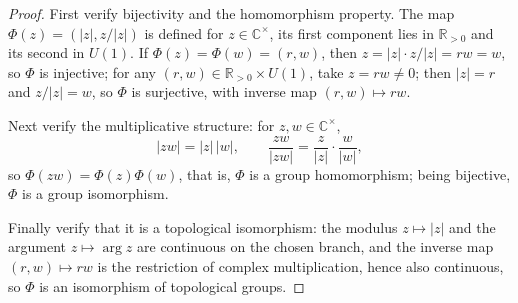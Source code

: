 \begin{proof}
First verify bijectivity and the homomorphism property. The map $\Phi(z)=(|z|,z/|z|)$ is defined for $z\in\mathbb{C}^{\times}$, its first component lies in $\mathbb{R}_{>0}$ and its second in $U(1)$. If $\Phi(z)=\Phi(w)=(r,w)$, then $z=|z|\cdot z/|z|=rw=w$, so $\Phi$ is injective; for any $(r,w)\in\mathbb{R}_{>0}\times U(1)$, take $z=rw\neq0$; then $|z|=r$ and $z/|z|=w$, so $\Phi$ is surjective, with inverse map $(r,w)\mapsto rw$.

Next verify the multiplicative structure: for $z,w\in\mathbb{C}^{\times}$,
\[
|zw|=|z|\,|w|,\qquad \frac{zw}{|zw|}=\frac{z}{|z|}\cdot\frac{w}{|w|},
\]
so $\Phi(zw)=\Phi(z)\Phi(w)$, that is, $\Phi$ is a group homomorphism; being bijective, $\Phi$ is a group isomorphism.

Finally verify that it is a topological isomorphism: the modulus $z\mapsto|z|$ and the argument $z\mapsto\arg z$ are continuous on the chosen branch, and the inverse map $(r,w)\mapsto rw$ is the restriction of complex multiplication, hence also continuous, so $\Phi$ is an isomorphism of topological groups.
\end{proof}

